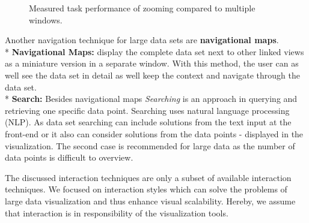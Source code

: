 \begin{figure}[H]
    \centering
    \caption{Measured task performance of zooming compared to multiple windows. \cite{Ware2012a}}
    \label{fig:my_label}
\end{figure}

Another navigation technique for large data sets are \textbf{navigational maps}.\\*
\textbf{Navigational Maps: } display the complete data set next to other linked views as a miniature version in a separate window. With this method, the user can as well see the data set in detail as well keep the context and navigate through the data set.\\*
\textbf{Search: }\label{search} Besides navigational maps \textit{Searching} is an approach in querying and retrieving one specific data point. Searching uses natural language processing (NLP). As data set searching can include solutions from the text input at the front-end or it also can consider solutions from the data points - displayed in the visualization. The second case is recommended for large data as the number of data points is difficult to overview.
\par

The discussed interaction techniques are only a subset of available interaction techniques. We focused on interaction styles which can solve the problems of large data visualization and thus enhance visual scalability\cite{Tegarden1999}. Hereby, we assume that interaction is in responsibility of the visualization tools.


